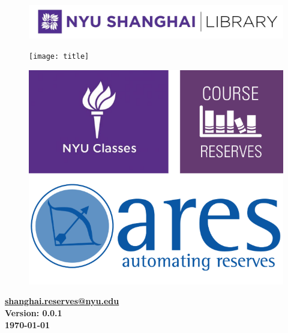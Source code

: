 \begin{titlepage}
    \begin{center}
     \vspace*{1cm}
     \begin{figure}[t]
        \centering
        \includegraphics[width=\textwidth]{images/nyushlib.png}
    \end{figure}
    
    \vspace*{1em}
    \begin{figure}[h]
        \centering
        \texttt{[image: title]}
    \end{figure}
    \vspace*{4em}
     
    \vspace*{1.5cm}
    \begin{figure}[h]
        \centering
        \includegraphics[scale=0.8]{images/cover.png}
    \end{figure}
    
    \vfill
    \href{mailto:shanghai.reserves@nyu.edu}{\large\bfseries shanghai.reserves@nyu.edu}\\
    \large\bfseries Version: 0.0.1\\
    \today
    \end{center}
\end{titlepage}